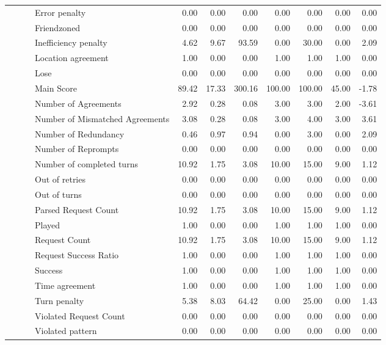 \begin{tabular}{llllrrrrrrr}
 &  &  & Error penalty & 0.00 & 0.00 & 0.00 & 0.00 & 0.00 & 0.00 & 0.00 \\
 &  &  & Friendzoned & 0.00 & 0.00 & 0.00 & 0.00 & 0.00 & 0.00 & 0.00 \\
 &  &  & Inefficiency penalty & 4.62 & 9.67 & 93.59 & 0.00 & 30.00 & 0.00 & 2.09 \\
 &  &  & Location agreement & 1.00 & 0.00 & 0.00 & 1.00 & 1.00 & 1.00 & 0.00 \\
 &  &  & Lose & 0.00 & 0.00 & 0.00 & 0.00 & 0.00 & 0.00 & 0.00 \\
 &  &  & Main Score & 89.42 & 17.33 & 300.16 & 100.00 & 100.00 & 45.00 & -1.78 \\
 &  &  & Number of Agreements & 2.92 & 0.28 & 0.08 & 3.00 & 3.00 & 2.00 & -3.61 \\
 &  &  & Number of Mismatched Agreements & 3.08 & 0.28 & 0.08 & 3.00 & 4.00 & 3.00 & 3.61 \\
 &  &  & Number of Redundancy & 0.46 & 0.97 & 0.94 & 0.00 & 3.00 & 0.00 & 2.09 \\
 &  &  & Number of Reprompts & 0.00 & 0.00 & 0.00 & 0.00 & 0.00 & 0.00 & 0.00 \\
 &  &  & Number of completed turns & 10.92 & 1.75 & 3.08 & 10.00 & 15.00 & 9.00 & 1.12 \\
 &  &  & Out of retries & 0.00 & 0.00 & 0.00 & 0.00 & 0.00 & 0.00 & 0.00 \\
 &  &  & Out of turns & 0.00 & 0.00 & 0.00 & 0.00 & 0.00 & 0.00 & 0.00 \\
 &  &  & Parsed Request Count & 10.92 & 1.75 & 3.08 & 10.00 & 15.00 & 9.00 & 1.12 \\
 &  &  & Played & 1.00 & 0.00 & 0.00 & 1.00 & 1.00 & 1.00 & 0.00 \\
 &  &  & Request Count & 10.92 & 1.75 & 3.08 & 10.00 & 15.00 & 9.00 & 1.12 \\
 &  &  & Request Success Ratio & 1.00 & 0.00 & 0.00 & 1.00 & 1.00 & 1.00 & 0.00 \\
 &  &  & Success & 1.00 & 0.00 & 0.00 & 1.00 & 1.00 & 1.00 & 0.00 \\
 &  &  & Time agreement & 1.00 & 0.00 & 0.00 & 1.00 & 1.00 & 1.00 & 0.00 \\
 &  &  & Turn penalty & 5.38 & 8.03 & 64.42 & 0.00 & 25.00 & 0.00 & 1.43 \\
 &  &  & Violated Request Count & 0.00 & 0.00 & 0.00 & 0.00 & 0.00 & 0.00 & 0.00 \\
 &  &  & Violated pattern & 0.00 & 0.00 & 0.00 & 0.00 & 0.00 & 0.00 & 0.00 \\

\end{tabular}
